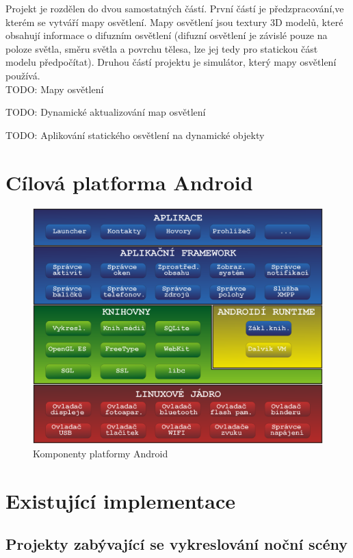 \documentclass[11pt,twoside,a4paper]{book}
\begin{document}
Projekt je rozdělen do dvou samostatných částí. První částí je předzpracování,\linebreak ve kterém se vytváří mapy osvětlení. Mapy osvětlení jsou textury 3D modelů, které obsahují informace o difuzním osvětlení (difuzní osvětlení je závislé pouze na poloze světla, směru světla a povrchu tělesa, lze jej tedy pro statickou část modelu předpočítat). Druhou částí projektu je simulátor, který mapy osvětlení používá.
\\

TODO: Mapy osvětlení

TODO: Dynamické aktualizování map osvětlení

TODO: Aplikování statického osvětlení na dynamické objekty
\newpage

\section{Cílová platforma Android}
\begin{center}
\begin{figure}[h!]
\includegraphics[width=120mm]{figures/android.png}
\caption{Komponenty platformy Android}
\end{figure}
\end{center}

\section{Existující implementace}

\subsection{Projekty zabývající se vykreslování noční scény}
\end{document}
